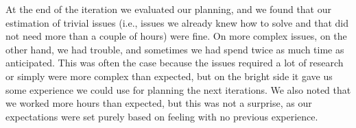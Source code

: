 At the end of the iteration we evaluated our planning, and we found that our estimation of trivial issues (i.e., issues we already knew how to solve and that did not need more than a couple of hours) were fine. On more complex issues, on the other hand, we had trouble, and sometimes we had spend twice as much time as anticipated. This was often the case because the issues required a lot of research or simply were more complex than expected, but on the bright side it gave us some experience we could use for planning the next iterations. We also noted that we worked more hours than expected, but this was not a surprise, as our expectations were set purely based on feeling with no previous experience.



